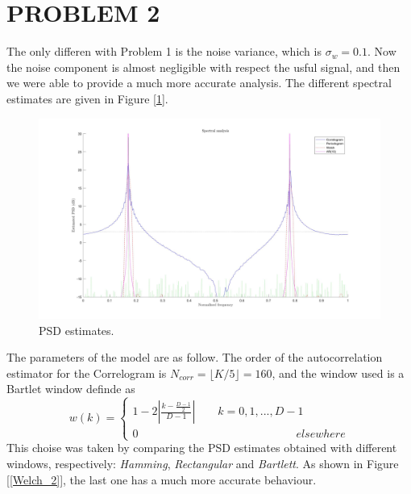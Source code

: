 \documentclass[a4paper,11pt,openright,twoside]{report}
\begin{document}
\clearpage
\section*{PROBLEM 2}
The only differen with Problem 1 is the noise variance, which is $\sigma_w=0.1$. Now the noise component is almost negligible with respect the usful signal, and then we were able to provide a much more accurate analysis. The different spectral estimates are given in Figure [\ref{PSD_2}]. \\

\begin{figure}[h!]
	\centering
	\includegraphics[width=14cm]{images/PSD_2.jpg}
	\caption{PSD estimates.}\label{PSD_2} 
\end{figure}

The parameters of the model are as follow. The order of the autocorrelation estimator for the Correlogram is $ N_{corr} = \lfloor K/5 \rfloor = 160 $, and the window used is a Bartlet window definde as
\begin{equation}\label{Bart}
w(k) = \begin{cases}
1-2 \left | \frac{k-\frac{D-1}{2}}{D-1} \right | \quad \quad k=0,1,...,D-1 \\
0 \quad \quad \quad \quad \quad \quad \quad \quad \quad\quad \quad \quad \quad \quad elsewhere
\end{cases}
\end{equation} 
This choise was taken by comparing the PSD estimates obtained with different windows, respectively: \textit{Hamming}, \textit{Rectangular} and \textit{Bartlett}. As shown in Figure [\ref{Welch_2}], the last one has a much more accurate behaviour.
\end{document}
